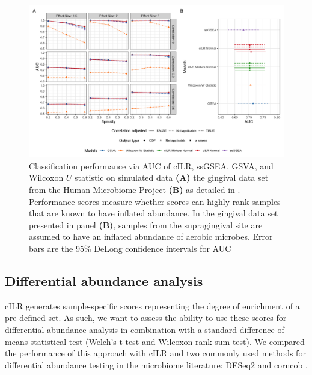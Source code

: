 \documentclass[10pt,letterpaper]{article}
\begin{document}
\begin{figure}[!h]
    \centering
    \includegraphics[width = \textwidth]{figures/sim_data_ss_auc.png}
    \caption{Classification performance via AUC of cILR, ssGSEA, GSVA, and Wilcoxon $U$ statistic on simulated data \textbf{(A)} the gingival data set from the Human Microbiome Project  \textbf{(B)} as detailed in . Performance scores measure whether scores can highly rank samples that are known to have inflated abundance. In the gingival data set presented in panel \textbf{(B)}, samples from the supragingival site are assumed to have an inflated abundance of aerobic microbes. Error bars are the 95\% DeLong confidence intervals for AUC \cite{delong1988}} 
    \label{fig:3}
\end{figure}

\subsection*{Differential abundance analysis}
cILR generates sample-specific scores representing the degree of enrichment of a pre-defined set. As such, we want to assess the ability to use these scores for differential abundance analysis in combination with a standard difference of means statistical test (Welch's t-test and Wilcoxon rank sum test). We compared the performance of this approach with cILR and two commonly used methods for differential abundance testing in the microbiome literature: DESeq2 \cite{love2014} and corncob \cite{martin2020}.   
\end{document}
